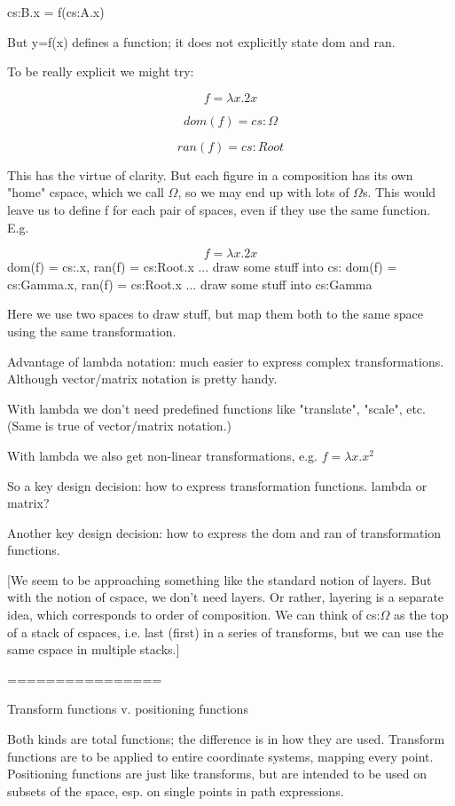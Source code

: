 \documentclass[reqno,12pt]{tufte-handout}
\numberwithin{equation}{subsection}
\numberwithin{equation}{subsection}
\begin{document}
cs:B.x = f(cs:A.x)

But y=f(x) defines a function; it does not explicitly state dom and ran.

To be really explicit we might try:

$$f = \lambda x.2x$$

$$dom(f) = cs:\Omega$$

$$ran(f) = cs:Root$$

This has the virtue of clarity.  But each figure in a composition has
its own "home" cspace, which we call $\Omega$, so we may end up with lots
of $\Omega$s.  This would leave us to define f for each pair of spaces,
even if they use the same function.  E.g.


$$f = \lambda x.2x$$
dom(f) = cs:\Omega.x, ran(f) = cs:Root.x
... draw some stuff into cs:\Omega
dom(f) = cs:Gamma.x, ran(f) = cs:Root.x
... draw some stuff into cs:Gamma

Here we use two spaces to draw stuff, but map them both to the same
space using the same transformation.

Advantage of lambda notation: much easier to express complex
transformations.  Although vector/matrix notation is pretty handy.

With lambda we don't need predefined functions like "translate",
"scale", etc.  (Same is true of vector/matrix notation.)

With lambda we also get non-linear transformations, e.g. 
\(f = \lambda x.x^2\)

So a key design decision: how to express transformation functions.
lambda or matrix?

Another key design decision: how to express the dom and ran of
transformation functions.

[We seem to be approaching something like the standard notion of
  layers.  But with the notion of cspace, we don't need layers.  Or
  rather, layering is a separate idea, which corresponds to order of
  composition.  We can think of cs:$\Omega$ as the top of a stack of
  cspaces, i.e. last (first) in a series of transforms, but we can use
  the same cspace in multiple stacks.]

================

Transform functions v. positioning functions

Both kinds are total functions; the difference is in how they are
used.  Transform functions are to be applied to entire coordinate
systems, mapping every point.  Positioning functions are just like
transforms, but are intended to be used on subsets of the space,
esp. on single points in path expressions.
\end{document}
